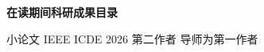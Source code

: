 \newpage
\thispagestyle{empty}

\begin{center}
  {\fontsize{16pt}{24pt}\selectfont\bfseries 在读期间科研成果目录}
\end{center}

\vspace{1.2em}

\begin{achievementlist}
  \achievement%
    {小论文}%
    {IEEE ICDE 2026}%
    {第二作者}%
    {导师为第一作者}
  \achievementempty
  \achievementempty
\end{achievementlist}

\vfill
\newpage
